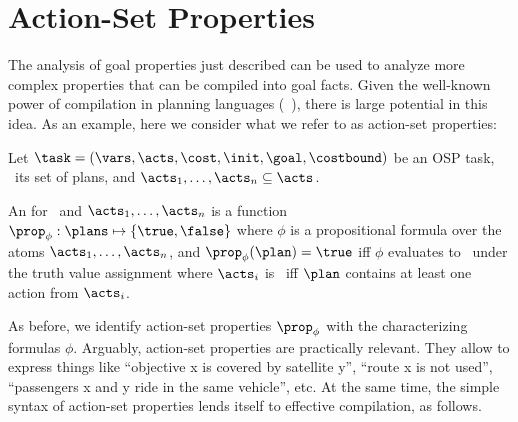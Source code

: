 \section{Action-Set Properties}
\label{actionsetprops}






The analysis of goal properties just described can be used to analyze
more complex properties that can be compiled into goal facts. Given
the well-known power of compilation in planning languages
(\eg\ \cite{gazen:knoblock:ecp-97,nebel:jair-00,edelkamp:icaps-06,palacios:geffner:jair-09,baier:etal:ai-09}),
there is large potential in this idea. As an example, here we consider
what we refer to as action-set properties:

%
\begin{definition}\label{def:action-set-properties}
Let $\task =
(\vars,\allowbreak\acts,\allowbreak\cost,\allowbreak\init,\allowbreak\goal,\allowbreak\costbound)$
be an OSP task, \plans\ its set of plans, and $\acts_1, \dots, \acts_n
\subseteq \acts$.

An  for \task\ and $\acts_1, \dots,
\acts_n$ is a function $\prop_\phi : \plans \mapsto \{\true, \false\}$
where $\phi$ is a propositional formula over the atoms $\acts_1,
\dots, \acts_n$, and $\prop_\phi(\plan) = \true$ iff $\phi$ evaluates
to \true\ under the truth value assignment where $\acts_i$ is
\true\ iff $\plan$ contains at least one action from $\acts_i$.
\end{definition}

As before, we identify action-set properties $\prop_\phi$ with the
characterizing formulas $\phi$. Arguably, action-set properties are
practically relevant. They allow to express things like ``objective x
is covered by satellite y'', %
%
``route x is not used'',
%
``passengers x and y ride in the same vehicle'',
%
etc. At the same time, the simple syntax of action-set
properties lends itself to effective compilation, as follows.


